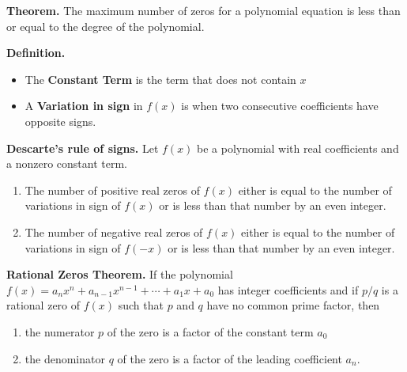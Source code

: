 \documentclass{report}
\begin{document}
    \bigbreak \noindent \bigbreak \noindent
    \begin{mdframed}
      \textbf{Theorem.}
      \bigbreak \noindent 
      The maximum number of zeros for a polynomial equation is less than or equal to the degree of the polynomial.
    \end{mdframed}
    \bigbreak \noindent 
    \begin{mdframed}
      \textbf{Definition.}
      \begin{itemize}
        \item The \textbf{Constant Term} is the term that does not contain $x $
        \item A \textbf{Variation in sign} in $f(x)$ is when two consecutive coefficients have opposite signs.
      \end{itemize}
    \end{mdframed}
    \pagebreak \bigbreak \noindent
    \begin{mdframed}
      \textbf{Descarte's rule of signs.}
      \bigbreak \noindent 
      Let $f(x)$ be a polynomial with real coefficients and a nonzero constant term.
      \begin{enumerate}
      \item The number of positive real zeros of $f(x)$ either is equal to the number of variations in sign of $f(x)$ or is less than that number by an even integer.
      \item The number of negative real zeros of $f(x)$ either is equal to the number of variations in sign of $f(-x)$ or is less than that number by an even integer.
      \end{enumerate}
    \end{mdframed}
    \bigbreak \noindent 
    \bigbreak \noindent 
    \begin{mdframed}
      \textbf{Rational Zeros Theorem.}
      \bigbreak \noindent 
      If the polynomial $f(x) = a_nx^n + a_{n-1}x^{n-1} + \cdots + a_1x + a_0$ has integer coefficients and if $p/q$ is a rational zero of $f(x)$ such that $p$ and $q$ have no common prime factor, then
      \begin{enumerate}
      \item the numerator $p$ of the zero is a factor of the constant term $a_0$
      \item the denominator $q$ of the zero is a factor of the leading coefficient $a_n$.
      \end{enumerate}
    \end{mdframed}
\end{document}
